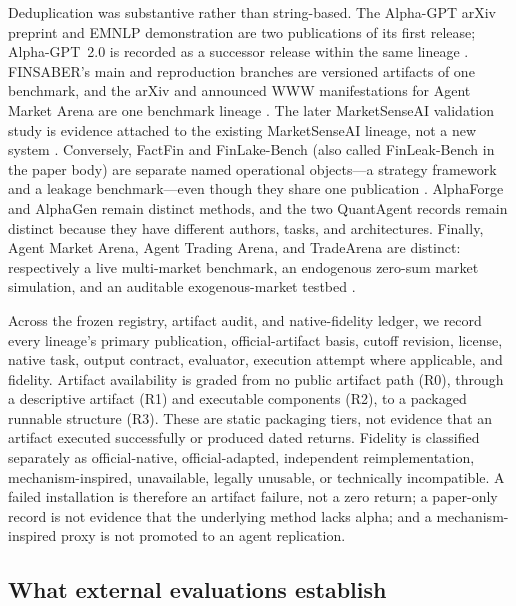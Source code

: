 Deduplication was substantive rather than string-based.  The Alpha-GPT arXiv
preprint and EMNLP demonstration are two publications of its first release;
Alpha-GPT~2.0 is recorded as a successor release within the same lineage
\citep{li2023alphagpt,WangEtAl2025AlphaGPT,YuanEtAl2024AlphaGPT2}.  FINSABER's main and
reproduction branches are versioned artifacts of one benchmark, and the arXiv
and announced WWW manifestations for Agent Market Arena are one benchmark lineage
\citep{LiEtAl2026FINSABER,zhang2026agentmarketarena}.  The later MarketSenseAI
validation study is evidence attached to the existing MarketSenseAI lineage,
not a new system \citep{FatourosMetaxas2026SignalOrNoise}.  Conversely, FactFin and
FinLake-Bench (also called FinLeak-Bench in the paper body) are separate named
operational objects---a strategy framework and a leakage benchmark---even
though they share one publication \citep{li2025profitmirage}.  AlphaForge and
AlphaGen remain distinct methods, and the two QuantAgent records remain
distinct because they have different authors, tasks, and architectures.
Finally, Agent Market Arena, Agent Trading Arena, and TradeArena are distinct:
respectively a live multi-market benchmark, an endogenous zero-sum market
simulation, and an auditable exogenous-market testbed
\citep{zhang2026agentmarketarena,ma2025agenttradingarena,xue2026tradearena}.

Across the frozen registry, artifact audit, and native-fidelity ledger, we
record every lineage's primary publication, official-artifact basis, cutoff
revision, license, native task, output contract, evaluator, execution attempt
where applicable, and fidelity.
Artifact availability is graded from no public artifact path (R0), through a
descriptive artifact (R1) and executable components (R2), to a packaged
runnable structure (R3).  These are static packaging tiers, not evidence that
an artifact executed successfully or produced dated returns.  Fidelity is classified separately as
official-native, official-adapted, independent reimplementation,
mechanism-inspired, unavailable, legally unusable, or technically
incompatible.  A failed installation is therefore an artifact failure, not a
zero return; a paper-only record is not evidence that the underlying method
lacks alpha; and a mechanism-inspired proxy is not promoted to an agent
replication.

\subsection{What external evaluations establish}

